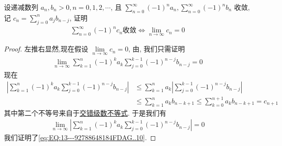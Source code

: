 \documentclass[../../main.tex]{subfiles}
\begin{document}
\begin{example}
设递减数列 $a_n, b_n > 0, n = 0, 1, 2, \cdots$, 且 $\sum\limits_{n=0}^{\infty} (-1)^n a_n, \sum\limits_{n=0}^{\infty} (-1)^n b_n$ 收敛, 记 $c_n = \sum\limits_{j=0}^{n} a_j b_{n-j}$, 证明
\begin{align}
\sum\limits_{n=0}^{\infty} (-1)^n c_n \text{收敛} \iff \lim\limits_{n\to\infty} c_n = 0
\label{eq:EQ:13---92788648184FDAG..10}
\end{align}
\end{example}
\begin{proof}
左推右显然,现在假设 $\lim\limits_{n\to\infty} c_n = 0$, 由, 我们只需证明
\begin{align*}
\lim\limits_{n\to\infty} \sum\limits_{k=1}^{n} (-1)^k a_k \sum\limits_{j=0}^{k-1} (-1)^{n-j} b_{n-j} = 0
\end{align*}
现在
\begin{align*}
\left| \sum\limits_{k=1}^{n} (-1)^k a_k \sum\limits_{j=0}^{k-1} (-1)^{n-j} b_{n-j} \right| &\leqslant \sum\limits_{k=1}^{n} a_k \left| \sum\limits_{j=0}^{k-1} (-1)^{n-j} b_{n-j} \right| \\
&\leqslant \sum\limits_{k=1}^{n} a_k b_{n - k + 1} \leqslant \sum\limits_{k=0}^{n+1} a_k b_{n - k + 1} = c_{n+1}
\end{align*}
其中第二个不等号来自于\hyperref[theorem:交错级数不等式]{交错级数不等式}. 于是我们有
\begin{align*}
\lim\limits_{n\to\infty} \left| \sum\limits_{k=1}^{n} (-1)^k a_k \sum\limits_{j=0}^{k-1} (-1)^{n-j} b_{n-j} \right| = 0
\end{align*}
我们证明了\eqref{eq:EQ:13---92788648184FDAG..10}.

\end{proof}
\end{document}
